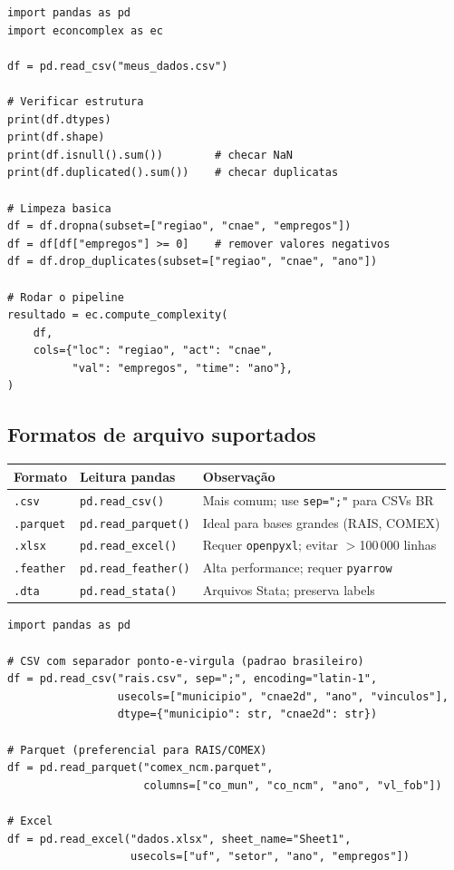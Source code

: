 \documentclass[12pt, a4paper]{article}
\begin{document}
\begin{lstlisting}[caption={Verifica\c{c}\~{a}o e prepara\c{c}\~{a}o do DataFrame antes do pipeline}]
import pandas as pd
import econcomplex as ec

df = pd.read_csv("meus_dados.csv")

# Verificar estrutura
print(df.dtypes)
print(df.shape)
print(df.isnull().sum())        # checar NaN
print(df.duplicated().sum())    # checar duplicatas

# Limpeza basica
df = df.dropna(subset=["regiao", "cnae", "empregos"])
df = df[df["empregos"] >= 0]    # remover valores negativos
df = df.drop_duplicates(subset=["regiao", "cnae", "ano"])

# Rodar o pipeline
resultado = ec.compute_complexity(
    df,
    cols={"loc": "regiao", "act": "cnae",
          "val": "empregos", "time": "ano"},
)
\end{lstlisting}

\subsection{Formatos de arquivo suportados}

\begin{center}
\renewcommand{\arraystretch}{1.3}
\begin{tabular}{lll}
\toprule
\textbf{Formato} & \textbf{Leitura pandas} & \textbf{Observa\c{c}\~{a}o} \\
\midrule
\texttt{.csv}     & \texttt{pd.read\_csv()}     & Mais comum; use \texttt{sep=";"} para CSVs BR \\
\texttt{.parquet} & \texttt{pd.read\_parquet()} & Ideal para bases grandes (RAIS, COMEX) \\
\texttt{.xlsx}    & \texttt{pd.read\_excel()}   & Requer \texttt{openpyxl}; evitar $>$100\,000 linhas \\
\texttt{.feather} & \texttt{pd.read\_feather()} & Alta performance; requer \texttt{pyarrow} \\
\texttt{.dta}     & \texttt{pd.read\_stata()}   & Arquivos Stata; preserva labels \\
\bottomrule
\end{tabular}
\end{center}

\begin{lstlisting}[caption={Leitura de diferentes formatos de arquivo}]
import pandas as pd

# CSV com separador ponto-e-virgula (padrao brasileiro)
df = pd.read_csv("rais.csv", sep=";", encoding="latin-1",
                 usecols=["municipio", "cnae2d", "ano", "vinculos"],
                 dtype={"municipio": str, "cnae2d": str})

# Parquet (preferencial para RAIS/COMEX)
df = pd.read_parquet("comex_ncm.parquet",
                     columns=["co_mun", "co_ncm", "ano", "vl_fob"])

# Excel
df = pd.read_excel("dados.xlsx", sheet_name="Sheet1",
                   usecols=["uf", "setor", "ano", "empregos"])
\end{lstlisting}
\end{document}
